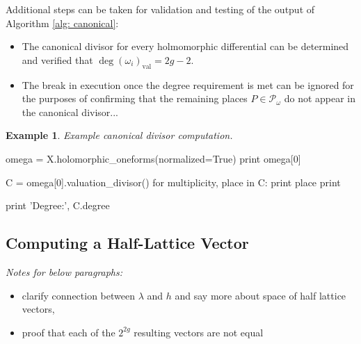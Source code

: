 \documentclass[12pt]{article}
\theoremstyle{definition}
\newtheorem{example}[theorem]{Example}
\begin{document}
Additional steps can be taken for validation and testing of the output
of Algorithm \ref{alg: canonical}:
\begin{itemize}
\item The canonical divisor for every holmomorphic differential can be
  determined and verified that $\deg (\omega_i)_\text{val} = 2g-2$.
\item The break in execution once the degree requirement is met can be
  ignored for the purposes of confirming that the remaining places $P
  \in \mathcal{P}_\omega$ do not appear in the canonical divisor...
\end{itemize}


\begin{example}
  {\it Example canonical divisor computation.}

\begin{ipythoninput}
omega = X.holomorphic_oneforms(normalized=True)
print omega[0]
\end{ipythoninput}
\begin{ipythonoutput}
[XXX]
\end{ipythonoutput}
\begin{ipythoninput}
C = omega[0].valuation_divisor()
for multiplicity, place in C:
    print place
    print

print 'Degree:', C.degree
\end{ipythoninput}
\begin{ipythonoutput}
[XXX]
\end{ipythonoutput}
\end{example}




\subsection{Computing a Half-Lattice Vector}



{\it
  Notes for below paragraphs:
  \begin{itemize}
    \item clarify connection between $\lambda$ and $h$ and say more
      about space of half lattice vectors,
    \item proof that each of the $2^{2g}$ resulting vectors are not equal
  \end{itemize}
}
\end{document}
